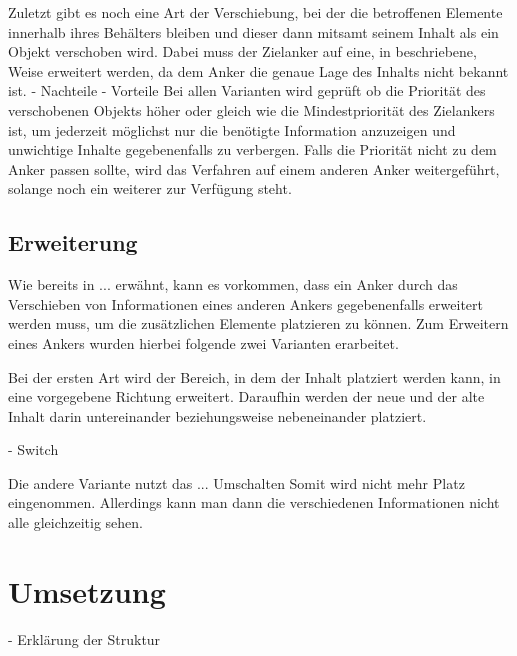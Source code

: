 			
			Zuletzt gibt es noch eine Art der Verschiebung, bei der die betroffenen Elemente innerhalb ihres Behälters bleiben und dieser dann mitsamt seinem Inhalt als ein Objekt verschoben wird. Dabei muss der Zielanker auf eine, in beschriebene, Weise erweitert werden, da dem Anker die genaue Lage des Inhalts nicht bekannt ist. - Nachteile - Vorteile 
			Bei allen Varianten wird geprüft ob die Priorität des verschobenen Objekts höher oder gleich wie die Mindestpriorität des Zielankers ist, um jederzeit möglichst nur die benötigte Information anzuzeigen und unwichtige Inhalte gegebenenfalls zu verbergen. Falls die Priorität nicht zu dem Anker passen sollte, wird das Verfahren auf einem anderen Anker weitergeführt, solange noch ein weiterer zur Verfügung steht.
			
		\subsection{Erweiterung}
			Wie bereits in ... erwähnt, kann es vorkommen, dass ein Anker durch das Verschieben von Informationen eines anderen Ankers gegebenenfalls erweitert werden muss, um die zusätzlichen Elemente platzieren zu können.
			Zum Erweitern eines Ankers wurden hierbei folgende zwei Varianten erarbeitet.
			
			Bei der ersten Art wird der Bereich, in dem der Inhalt platziert werden kann, in eine vorgegebene Richtung erweitert. Daraufhin werden der neue und der alte Inhalt darin untereinander beziehungsweise nebeneinander platziert.
			
			
			- Switch
			
			Die andere Variante nutzt das ... Umschalten
			Somit wird nicht mehr Platz eingenommen.
			Allerdings kann man dann die verschiedenen Informationen nicht alle gleichzeitig sehen.
			
			
			
			
	\section{Umsetzung}
		- Erklärung der Struktur
			
